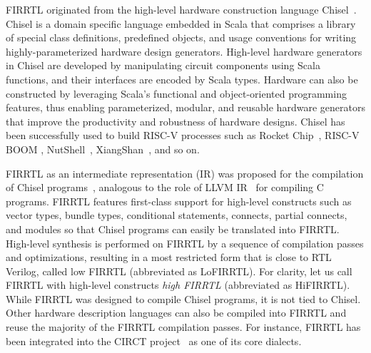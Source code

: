 FIRRTL originated from the high-level hardware construction language Chisel~\cite{BachrachVRLWAWA12}.
Chisel is a domain specific language embedded in Scala that comprises a library of special class definitions, predefined objects, and usage conventions for writing highly-parameterized hardware design generators.
High-level hardware generators in Chisel are developed by manipulating circuit components using Scala functions, and their interfaces are encoded by Scala types.
Hardware can also be constructed by leveraging Scala's functional and object-oriented programming features, thus enabling parameterized, modular, and reusable hardware generators that improve the productivity and robustness of  hardware designs.
Chisel has been successfully used to build RISC-V processes such as Rocket Chip~\cite{RocketChip}, RISC-V BOOM \cite{Boom}, NutShell~\cite{NutShell},
XiangShan~\cite{xiangshan,Xiangshan-github}, and so on.

FIRRTL as an intermediate representation (IR)  was proposed for the compilation of Chisel programs~\cite{IzraelevitzKLLW17}, analogous to the role of LLVM IR~\cite{LLVM} for compiling C programs.
FIRRTL features first-class support for high-level constructs such as vector types, bundle types, conditional statements, connects, partial connects,
and modules so that Chisel programs can easily be translated into FIRRTL.
%
High-level synthesis is performed on FIRRTL by a sequence of compilation passes and optimizations,
resulting in a most restricted form that is close to RTL Verilog, called low FIRRTL (abbreviated as LoFIRRTL).
For clarity, let us call FIRRTL with high-level constructs \emph{high FIRRTL} (abbreviated as HiFIRRTL).
While FIRRTL was designed to compile Chisel programs, it is not tied to Chisel. Other hardware description languages can also be compiled into FIRRTL and reuse the majority of the FIRRTL compilation passes. For instance, FIRRTL has been integrated into the CIRCT project~\cite{CIRCT} as one of its core dialects.



